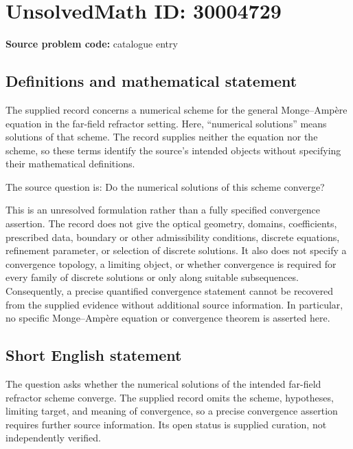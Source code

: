 \documentclass[11pt]{article}
\begin{document}
\section*{UnsolvedMath ID: 30004729}
\textbf{Source problem code:} catalogue entry
\subsection{Definitions and mathematical statement}
The supplied record concerns a numerical scheme for the general Monge--Amp\`ere equation in the far-field refractor setting. Here, ``numerical solutions'' means solutions of that scheme. The record supplies neither the equation nor the scheme, so these terms identify the source's intended objects without specifying their mathematical definitions.

The source question is: Do the numerical solutions of this scheme converge?

This is an unresolved formulation rather than a fully specified convergence assertion. The record does not give the optical geometry, domains, coefficients, prescribed data, boundary or other admissibility conditions, discrete equations, refinement parameter, or selection of discrete solutions. It also does not specify a convergence topology, a limiting object, or whether convergence is required for every family of discrete solutions or only along suitable subsequences. Consequently, a precise quantified convergence statement cannot be recovered from the supplied evidence without additional source information. In particular, no specific Monge--Amp\`ere equation or convergence theorem is asserted here.
\subsection{Short English statement}
The question asks whether the numerical solutions of the intended far-field refractor scheme converge. The supplied record omits the scheme, hypotheses, limiting target, and meaning of convergence, so a precise convergence assertion requires further source information. Its open status is supplied curation, not independently verified.
\end{document}
